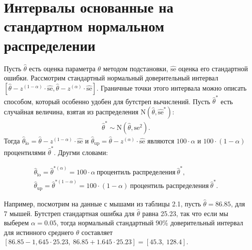 \section{Интервалы основанные на стандартном нормальном распределении}
Пусть $\widehat{\theta}$ есть оценка параметра $\theta$ методом подстановки, $\widehat{\text{se}}$ оценка его стандартной ошибки. Рассмотрим стандартный нормальный доверительный интервал $[ \widehat{\theta} - z^{(1 - \alpha)} \cdot \widehat{\text{se}}, \widehat{\theta} - z^{(\alpha)}\cdot \widehat{\text{se}}]$. Граничные точки этого интервала можно описать способом, который особенно удобен для бутстреп вычислений. Пусть $\widehat{\theta}^{*}$  есть случайная величина, взятая из распределения $\mathrm{N}(\widehat{\theta}, \widehat{\text{se}}^{*})$:
\begin{gather}\label{13.1}
\widehat{\theta}^{*}\sim \mathrm{N}(\widehat{\theta}, \text{se}^{2}).
\end{gather}
Тогда $\widehat{\theta}_{\text{lo}} = \widehat{\theta}  - z^{(1 - \alpha)} \cdot \widehat{\text{se}} $ и $\widehat{\theta}_{\text{up}} = \widehat{\theta}  - z^{(\alpha)} \cdot \widehat{\text{se}}$  являются $100\cdot \alpha$ и $100 \cdot (1 - \alpha)$ процентилями $\widehat{\theta}^{*}$. Другми словами:

\begin{gather}\label{13.2}
\widehat{\theta}_{\text{lo}} = \widehat{\theta}^{*(\alpha)} = 100 \cdot \alpha \ \text{процентиль распределения} \  \widehat{\theta}^{*}, \\
\widehat{\theta}_{\text{up}} = \widehat{\theta}^{*(1 - \alpha)} = 100 \cdot (1 - \alpha) \  \text{процентиль распределения} \  \widehat{\theta}^{*}.
\end{gather}

Например, посмотрим на данные с мышами из таблицы 2.1, пусть $\widehat{\theta} = 86.85$, для 7 мышей. Бутстреп стандартная ошибка для $\widehat{\theta}$ равна 25.23, так что если мы выберем $\alpha = 0.05$, тогда нормальный стандартный $90\%$ доверительный интервал для истинного среднего  $\theta$  составляет $[86.85 - 1,645 \cdot 25.23, \ 86.85 + 1.645 \cdot 25.23] = [45.3,\ 128.4]$.

